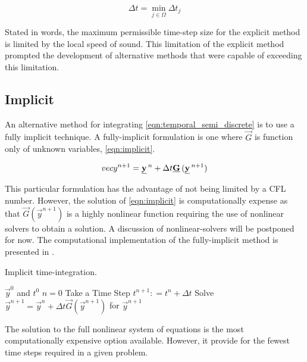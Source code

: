 \begin{equation}
\label{eqn:global_cfl}
\Delta t = \min_{j \in \Omega} \Delta t_j
\end{equation}

Stated in words, the maximum permissible time-step size for the explicit method is limited by the local speed of sound.
This limitation of the explicit method prompted the development of alternative methods that were capable of exceeding this limitation.

\subsection{Implicit}
\label{subsect:numerics_fully_implicit}
An alternative method for integrating \eqref{eqn:temporal_semi_discrete} is to use a fully implicit technique.
A fully-implicit formulation is one where $\vec{G}$ is function only of unknown variables, \eqref{eqn:implicit}.

\begin{equation}
\label{eqn:implicit}
\\vec{y}^{n+1} = \vec{y}^{n} + \Delta t \vec{G}(\vec{y}^{n+1})
\end{equation}

This particular formulation has the advantage of not being limited by a CFL number.
However, the solution of \eqref{eqn:implicit} is computationally expense as that $\vec{G}(\vec{y}^{n+1})$ is a highly nonlinear function requiring the use of nonlinear solvers to obtain a solution.
A discussion of nonlinear-solvers will be postponed for now.
The computational implementation of the fully-implicit method is presented in .

\begin{algo}[H]
\caption{Implicit time-integration.}
\label{algo:implicit}
\setlength{\baselineskip}{0.625\baselineskip}
\begin{algorithmic}[1]
\Require $\vec{y}^{0}$ and $t^{0}$
\Set $n = 0$
\Loop \; Take a Time Step	
    \State $t^{n+1} : = t^{n} + \Delta t$
    \BlackBox Solve $\vec{y}^{n+1} = \vec{y}^{n} + \Delta t \vec{G}(\vec{y}^{n+1})$ for $\vec{y}^{n+1}$
\end{algorithmic}
\end{algo}

The solution to the full nonlinear system of equations is the most computationally expensive option available.
However, it provide for the fewest time steps required in a given problem.

